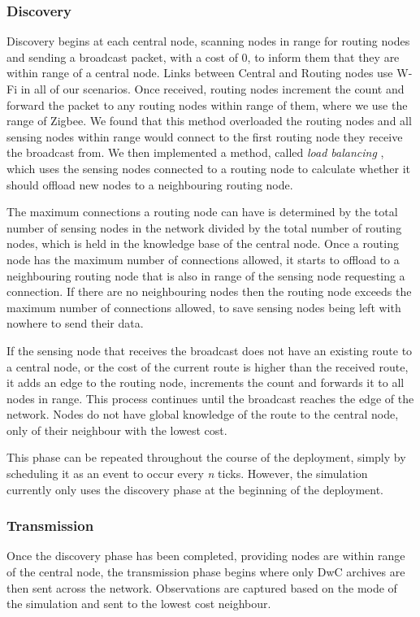\subsubsection{Discovery}\label{sim:disc}
	Discovery begins at each central node, scanning nodes in range for routing nodes and sending a broadcast packet, with a cost of 0, to inform them that they are within range of a central node. Links between Central and Routing nodes use W-Fi in all of our scenarios. Once received, routing nodes increment the count and forward the packet to any routing nodes within range of them, where we use the range of Zigbee. We found that this method overloaded the routing nodes and all sensing nodes within range would connect to the first routing node they receive the broadcast from. We then implemented a method, called \textit{load balancing} \cite{Gupta2003}, which uses the sensing nodes connected to a routing node to calculate whether it should offload new nodes to a neighbouring routing node.
	
	The maximum connections a routing node can have is determined by the total number of sensing nodes in the network divided by the total number of routing nodes, which is held in the knowledge base of the central node. Once a routing node has the maximum number of connections allowed, it starts to offload to a neighbouring routing node that is also in range of the sensing node requesting a connection. If there are no neighbouring nodes then the routing node exceeds the maximum number of connections allowed, to save sensing nodes being left with nowhere to send their data.
	
	If the sensing node that receives the broadcast does not have an existing route to a central node, or the cost of the current route is higher than the received route, it adds an edge to the routing node, increments the count and forwards it to all nodes in range. This process continues until the broadcast reaches the edge of the network. Nodes do not have global knowledge of the route to the central node, only of their neighbour with the lowest cost.
	
	This phase can be repeated throughout the course of the deployment, simply by scheduling it as an event to occur every \textit{n} ticks. However, the simulation currently only uses the discovery phase at the beginning of the deployment.
	
\subsubsection{Transmission}
	Once the discovery phase has been completed, providing nodes are within range of the central node, the transmission phase begins where only DwC archives are then sent across the network. Observations are captured based on the mode of the simulation and sent to the lowest cost neighbour.
	

